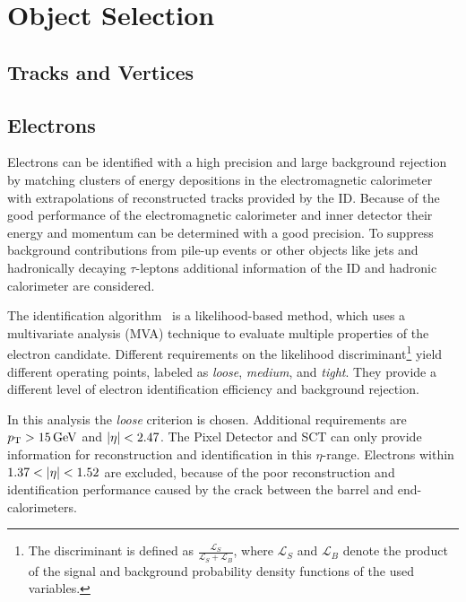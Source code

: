\chapter{Object Selection}\label{cha:object_selection}

\section{Tracks and Vertices}\label{sec:object_selection:tracks_and_vertices}

\section{Electrons}\label{sec:object_selection:electrons}

Electrons can be identified with a high precision and large background rejection by matching clusters of energy
depositions in the electromagnetic calorimeter with extrapolations of reconstructed tracks provided by the ID\@.
Because of the good performance of the electromagnetic calorimeter and inner detector their energy and momentum can
be determined with a good precision.
To suppress background contributions from pile-up events or other objects like jets and hadronically decaying $\tau$-leptons
additional information of the ID and hadronic calorimeter are considered.

The identification algorithm~\cite{ATLAS-CONF-2016-024} is a likelihood-based method, which uses a multivariate analysis (MVA) technique to
evaluate multiple properties of the electron candidate.
Different requirements on the likelihood discriminant\footnote{The discriminant is defined as
$\frac{\mathcal{L}_S}{\mathcal{L}_S + \mathcal{L}_B}$, where $\mathcal{L}_S$ and $\mathcal{L}_B$ denote the product of
the signal and background probability density functions of the used variables.} yield different operating points,
labeled as  \emph{loose}, \emph{medium}, and \emph{tight}.
They provide a different level of electron identification efficiency and background rejection.

In this analysis the \emph{loose} criterion is chosen.
Additional requirements are $\pt > \unit[15]{GeV}$ and $\left|\eta\right| < 2.47$.
The Pixel Detector and SCT can only provide information for reconstruction and identification in this $\eta$-range.
Electrons within $1.37 < \left|\eta\right| < 1.52$ are excluded, because of the poor reconstruction and identification
performance caused by the crack between the barrel and end-calorimeters.

